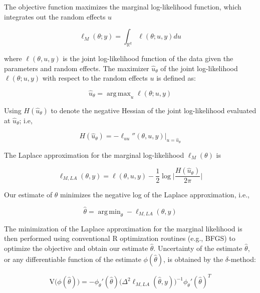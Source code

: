 \documentclass[preprint, 3p, authoryear]{elsarticle} %
\begin{document}
The objective function maximizes the marginal log-likelihood function, which integrates out the random effects \(u\)

\begin{equation}
  \ell_{M}(\theta; y)=\int_{\mathbb{R}^{q}} \ell (\theta;u,y) du
\end{equation}

where \(\ell(\theta, u,y)\) is the joint log-likelihood function of the data given the parameters and random effects. The maximizer \(\hat{u}_{\theta}\) of the joint log-likelihood \(\ell(\theta;u,y)\) with respect to the random effects \(u\) is defined as:

\begin{equation}
  \hat{u}_{\theta}=\mathop{\mathrm{arg\,max}}_{u} \ell(\theta;u,y)
\end{equation}

Using \(H(\hat{u}_{\theta})\) to denote the negative Hessian of the joint log-likelihood evaluated at \(\hat{u}_{\theta}\); i.e,

\begin{equation}
  H(\hat{u}_{\theta}) =-\ell_{uu}''(\theta, u, y)|_{u=\hat{u}_{\theta}}
\end{equation}

The Laplace approximation for the marginal log-likelihood \(\ell_M(\theta)\) is

\begin{equation}
  \ell_{M,LA}(\theta, y)=\ell(\theta,u,y)-\frac{1}{2}\log \Big|\frac{H(\hat{u}_{\theta})}{2\pi}\Big|
\end{equation}

Our estimate of \(\theta\) minimizes the negative log of the Laplace approximation, i.e.,

\begin{equation}
  \hat{\theta}=\mathop{\mathrm{arg\,min}}_{\theta} - \ell_{M, LA}(\theta, y)
\end{equation}

The minimization of the Laplace approximation for the marginal likelihood is then performed using conventional R optimization routines (e.g., BFGS) to optimize the objective and obtain our estimate \(\hat{\theta}\). Uncertainty of the estimate \(\hat{\theta}\), or any differentiable function of the estimate \(\phi(\hat{\theta})\), is obtained by the \(\delta\)-method:

\begin{equation}
  \mathrm{V}\big(\phi(\hat{\theta})\big)=-\phi_{\theta}'(\hat{\theta})\Big(\Delta^2 \ell_{M,LA}(\hat{\theta}, y)\Big)^{-1} \phi_{\theta}'(\hat{\theta})^T
\end{equation}
\end{document}
